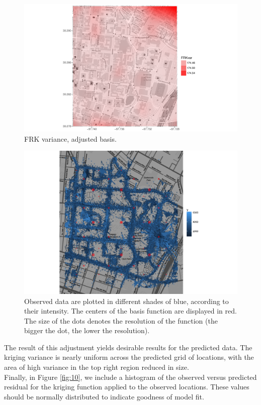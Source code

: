 \documentclass[11pt]{article}
\begin{document}
\begin{figure}[H]
\centering
\includegraphics[width=0.8\columnwidth]{Images/var_newgrid.pdf}
\caption{FRK variance, adjusted basis.}
\label{fig:8}
\end{figure}

\begin{figure}[H]
\centering
\includegraphics[width=0.8\columnwidth]{Images/data_grid_new.png}
\caption{Observed data are plotted in different shades of blue, according to their intensity. The centers of the basis function are displayed in red. The size of the dots denotes the resolution of the function (the bigger the dot, the lower the resolution).}
\label{fig:9}
\end{figure}

The result of this adjustment yields desirable results for the predicted data. The kriging variance is nearly uniform across the predicted grid of locations, with the area of high variance in the top right region reduced in size.\\

Finally, in Figure \ref{fig:10}, we include a histogram of the observed versus predicted residual for the kriging function applied to the observed locations.  These values should be normally distributed to indicate goodness of model fit.
\end{document}
